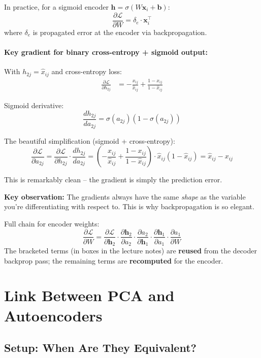 \documentclass[12pt,a4paper]{article}
\newcommand{\vx}{\mathbf{x}}
\newcommand{\vh}{\mathbf{h}}
\newcommand{\vb}{\mathbf{b}}
\newcommand{\Loss}{\mathcal{L}}
\begin{document}
In practice, for a sigmoid encoder $\vh = \sigma(W\vx_i + \vb)$:
\[
  \frac{\partial\Loss}{\partial W}
  = \delta_e \cdot \vx_i^\top
\]
where $\delta_e$ is propagated error at the encoder via backpropagation.

\paragraph{Key gradient for binary cross-entropy + sigmoid output:}
With $h_{2j} = \hat{x}_{ij}$ and cross-entropy loss:
\begin{align*}
  \frac{\partial\Loss}{\partial h_{2j}}
  &= -\frac{x_{ij}}{\hat{x}_{ij}} + \frac{1-x_{ij}}{1-\hat{x}_{ij}}
\end{align*}

Sigmoid derivative:
\[
  \frac{dh_{2j}}{da_{2j}} = \sigma(a_{2j})(1 - \sigma(a_{2j}))
\]

The beautiful simplification (sigmoid + cross-entropy):
\[
  \frac{\partial\Loss}{\partial a_{2j}}
  = \frac{\partial\Loss}{\partial h_{2j}} \cdot \frac{dh_{2j}}{da_{2j}}
  = \left(-\frac{x_{ij}}{\hat{x}_{ij}} + \frac{1-x_{ij}}{1-\hat{x}_{ij}}\right) \cdot \hat{x}_{ij}(1-\hat{x}_{ij})
  = \hat{x}_{ij} - x_{ij}
\]

This is remarkably clean -- the gradient is simply the prediction error.

\begin{keybox}
\textbf{Key observation:} The gradients always have the same \emph{shape} as the variable you're differentiating with respect to. This is why backpropagation is so elegant.
\end{keybox}

Full chain for encoder weights:
\[
  \frac{\partial\Loss}{\partial W}
  = \frac{\partial\Loss}{\partial\vh_2}
    \cdot \frac{\partial\vh_2}{\partial a_2}
    \cdot \frac{\partial a_2}{\partial\vh_1}
    \cdot \frac{\partial\vh_1}{\partial a_1}
    \cdot \frac{\partial a_1}{\partial W}
\]
The bracketed terms (in boxes in the lecture notes) are \textbf{reused} from the decoder backprop pass; the remaining terms are \textbf{recomputed} for the encoder.

\section{Link Between PCA and Autoencoders}

\subsection{Setup: When Are They Equivalent?}
\end{document}

